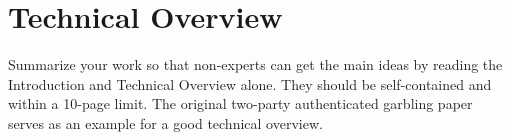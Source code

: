 
\section{Technical Overview}
\label{sec-overview}

Summarize your work so that non-experts can get the main ideas by reading the Introduction and Technical Overview alone. They should be self-contained and within a 10-page limit. The original two-party authenticated garbling paper~\cite{CCS:WanRanKat17a} serves as an example for a good technical overview.